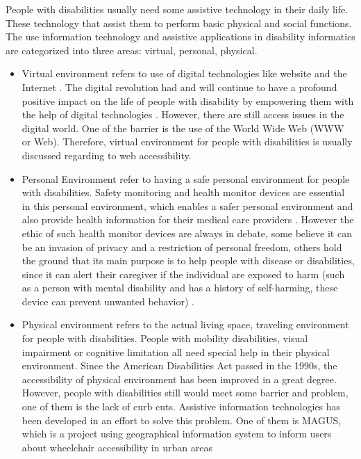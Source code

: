 People with disabilities usually need some 
assistive technology in their daily life. These technology that assist them to perform basic physical and 
social functions. The use information technology and assistive applications in disability informatics are 
categorized into three areas: virtual, personal, physical. 
\begin{itemize}
  \item Virtual environment refers to use of digital 
technologies like website and the Internet \cite{Appleyard2005}. The digital revolution had and will 
continue to have a profound positive impact on the life of people with
disability by empowering them with the help of digital technologies \cite{Appleyard2005}. However, there are
still access issues in the digital world. One of the barrier is the use of the World Wide Web (WWW or Web).
Therefore, virtual environment for people with disabilities is usually discussed regarding to web 
accessibility. 
  \item Personal Environment refer to having a safe personal environment for people with disabilities. Safety 
monitoring and health monitor devices are essential in this personal environment, which enables a 
safer personal environment and also provide health information for their medical care providers
 \cite{Appleyard2005}. However the ethic of such health monitor devices are always in debate, some believe
 it can be an invasion of privacy and a restriction of personal freedom, others hold the ground that its
 main purpose is to help people with disease or disabilities, since it can alert their caregiver if the
 individual are exposed to harm (such as a person with mental disability and has a history of self-harming,
 these device can prevent unwanted behavior) \cite{cunningham2017cloud}. 
  \item Physical environment refers to the actual living space, traveling environment for people with 
  disabilities. People with mobility disabilities, visual impairment or cognitive limitation all need 
  special help in their physical environment. Since the American Disabilities 
Act passed in the 1990s, the accessibility of physical environment has been
improved in a great degree. However, people with disabilities still would meet some barrier and problem, 
one of them is the lack of curb cuts. Assistive information technologies has been developed in an effort to
solve this problem. One of them is MAGUS, which is a project using geographical information system to inform 
users about wheelchair accessibility in urban areas \cite{Appleyard2005}
\end{itemize}






